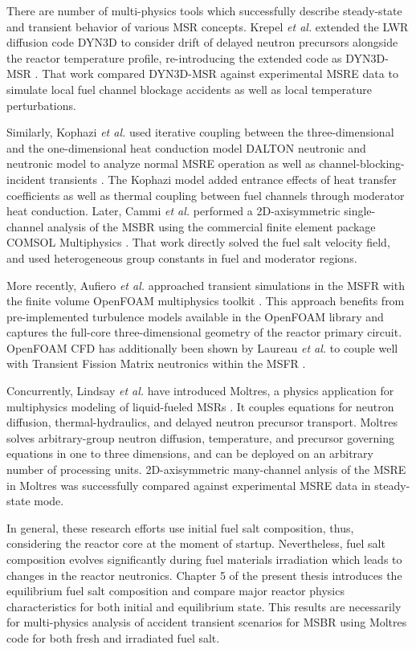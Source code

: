 There are number of multi-physics tools which successfully describe steady-state and transient behavior of various \gls{MSR} concepts. Krepel \emph{et al.} extended the \gls{LWR} diffusion code DYN3D to consider drift of delayed neutron precursors alongside the reactor temperature profile, re-introducing the extended code as DYN3D-MSR \cite{krepel_dyn3d-msr_2007}. That work compared DYN3D-MSR against experimental \gls{MSRE} data to simulate local fuel channel blockage accidents as well as local temperature perturbations.

Similarly, Kophazi \emph{et al.} used iterative coupling between the three-dimen\-sional and the one-dimensional heat conduction model DALTON neutronic and neutronic model to analyze normal \gls{MSRE} operation as well as channel-blocking-incident transients \cite{kophazi_development_2009}. The Kophazi model added entrance effects of heat transfer coefficients as well as thermal coupling between fuel channels through moderator heat conduction. Later, Cammi \emph{et al.} performed a 2D-axisymmetric single-channel analysis of the \gls{MSBR} using the commercial finite element package COMSOL Multiphysics \cite{cammi_multi-physics_2011}. That work directly solved the fuel salt velocity field, and used heterogeneous group constants in fuel and moderator regions.  

More recently, Aufiero \emph{et al.} \cite{aufiero_development_2014} approached transient simulations in the \gls{MSFR} with the finite volume OpenFOAM multiphysics toolkit \cite{weller_tensorial_1998}.  This approach benefits from pre-implemented turbulence models available in the OpenFOAM library and captures the full-core three-dimensional geometry of the reactor primary circuit.  OpenFOAM \gls{CFD} has additionally been shown by Laureau \emph{et al.} \cite{laureau_transient_2017} to couple well with Transient Fission Matrix neutronics within the \gls{MSFR} \cite{laureau_transient_2015}.

Concurrently, Lindsay \emph{et al.} have introduced Moltres, a physics application for multiphysics modeling of liquid-fueled \glspl{MSR} \cite{lindsay_introduction_2018}. It couples equations for neutron diffusion, thermal-hydraulics, and delayed neutron precursor transport. Moltres solves arbitrary-group neutron diffusion, temperature, and precursor governing equations in one to three dimensions, and can be deployed on an arbitrary number of processing units. 2D-axisymmetric many-channel anlysis of the \gls{MSRE} in Moltres was successfully compared against experimental \gls{MSRE} data in steady-state mode.

In general, these research efforts use initial fuel salt composition, thus, considering the reactor core at the moment of startup. Nevertheless, fuel salt composition evolves significantly during fuel materials irradiation which leads to changes in the reactor neutronics. Chapter 5 of the present thesis introduces the equilibrium fuel salt composition and compare major reactor physics characteristics for both initial and equilibrium state. This results are necessarily for multi-physics analysis of accident transient scenarios for \gls{MSBR} using Moltres code for both fresh and irradiated fuel salt.

